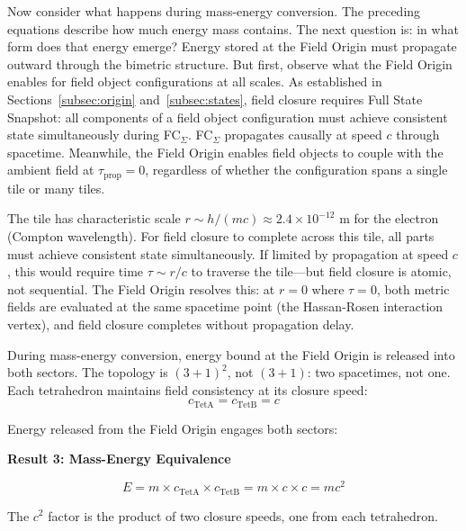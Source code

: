 \documentclass[aps,prd,preprint,superscriptaddress,showpacs,preprintnumbers,amsmath,amssymb,nofootinbib]{revtex4-2}
\begin{document}
Now consider what happens during mass-energy conversion. The preceding equations describe how much energy mass contains. The next question is: in what form does that energy emerge? Energy stored at the Field Origin must propagate outward through the bimetric structure. But first, observe what the Field Origin enables for field object configurations at all scales. As established in Sections~\ref{subsec:origin} and~\ref{subsec:states}, field closure requires Full State Snapshot: all components of a field object configuration must achieve consistent state simultaneously during FC$_{\Sigma}$. FC$_{\Sigma}$ propagates causally at speed $c$ through spacetime. Meanwhile, the Field Origin enables field objects to couple with the ambient field at $\tau_{\text{prop}} = 0$, regardless of whether the configuration spans a single tile or many tiles.

The tile has characteristic scale $r \sim h/(mc) \approx 2.4 \times 10^{-12}$ m for the electron (Compton wavelength). For field closure to complete across this tile, all parts must achieve consistent state simultaneously. If limited by propagation at speed $c$, this would require time $\tau \sim r/c$ to traverse the tile—but field closure is atomic, not sequential. The Field Origin resolves this: at $r = 0$ where $\tau = 0$, both metric fields are evaluated at the same spacetime point (the Hassan-Rosen interaction vertex), and field closure completes without propagation delay.

During mass-energy conversion, energy bound at the Field Origin is released into both sectors. The topology is $(3{+}1)^2$, not $(3{+}1)$: two spacetimes, not one. Each tetrahedron maintains field consistency at its closure speed:
\begin{equation}
c_{\text{TetA}} = c_{\text{TetB}} = c
\end{equation}

Energy released from the Field Origin engages both sectors:

\vspace{1.5em}
\noindent
\colorbox{resultgreen}{\parbox{\dimexpr\textwidth-2\fboxsep\relax}{%
\vspace{0.8em}
\centering
\textbf{\large Result 3: Mass-Energy Equivalence}

\vspace{0.5em}
\boldmath
\begin{equation}
E = m \times c_{\text{TetA}} \times c_{\text{TetB}} = m \times c \times c = mc^2
\end{equation}
\unboldmath

\vspace{0.3em}
The $c^2$ factor is the product of two closure speeds, one from each tetrahedron.
\vspace{0.5em}
}}
\vspace{1cm}
\end{document}
